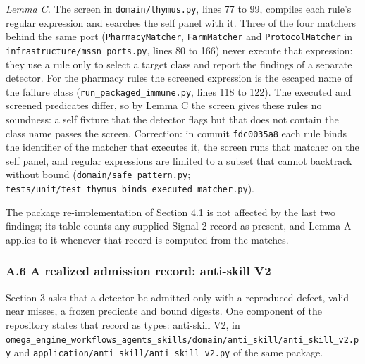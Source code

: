 \documentclass[
  11pt,
]{article}
\newcommand{\passthrough}[1]{#1}
\begin{document}
\emph{Lemma C.} The screen in \nolinkurl{domain/thymus.py}, lines 77 to
99, compiles each rule's regular expression and searches the self panel
with it. Three of the four matchers behind the same port
(\nolinkurl{PharmacyMatcher}, \passthrough{\lstinline!FarmMatcher!} and
\nolinkurl{ProtocolMatcher} in \nolinkurl{infrastructure/mssn_ports.py},
lines 80 to 166) never execute that expression: they use a rule only to
select a target class and report the findings of a separate detector.
For the pharmacy rules the screened expression is the escaped name of
the failure class (\nolinkurl{run_packaged_immune.py}, lines 118 to
122). The executed and screened predicates differ, so by Lemma C the
screen gives these rules no soundness: a self fixture that the detector
flags but that does not contain the class name passes the screen.
Correction: in commit \passthrough{\lstinline!fdc0035a8!} each rule
binds the identifier of the matcher that executes it, the screen runs
that matcher on the self panel, and regular expressions are limited to a
subset that cannot backtrack without bound
(\nolinkurl{domain/safe_pattern.py};
\nolinkurl{tests/unit/test_thymus_binds_executed_matcher.py}).

The package re-implementation of Section 4.1 is not affected by the last
two findings; its table counts any supplied Signal 2 record as present,
and Lemma A applies to it whenever that record is computed from the
matches.

\subsubsection{A.6 A realized admission record: anti-skill
V2}\label{a.6-a-realized-admission-record-anti-skill-v2}

Section 3 asks that a detector be admitted only with a reproduced
defect, valid near misses, a frozen predicate and bound digests. One
component of the repository states that record as types: anti-skill V2,
in
\nolinkurl{omega_engine_workflows_agents_skills/domain/anti_skill/anti_skill_v2.py}
and \nolinkurl{application/anti_skill/anti_skill_v2.py} of the same
package.
\end{document}

